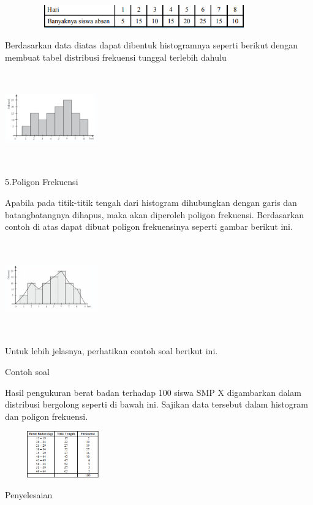 \documentclass[11pt,fleqn]{book} %
\begin{document}
{\includegraphics[width = 12cm, height= 1cm]{Pictures/7reska.png}

Berdasarkan data diatas dapat dibentuk histogramnya seperti berikut dengan membuat
tabel distribusi frekuensi tunggal terlebih dahulu

\includegraphics[width = 4cm, height= 4cm]{Pictures/8reska.png}

5.Poligon Frekuensi


Apabila pada titik-titik tengah dari histogram dihubungkan dengan garis dan batangbatangnya
dihapus, maka akan diperoleh poligon frekuensi. Berdasarkan contoh di atas
dapat dibuat poligon frekuensinya seperti gambar berikut ini.

\includegraphics[width = 4cm, height= 4cm]{Pictures/9reska.png}

Untuk lebih jelasnya, perhatikan contoh soal berikut ini.

Contoh soal

Hasil pengukuran berat badan terhadap 100 siswa SMP X digambarkan dalam distribusi
bergolong seperti di bawah ini. Sajikan data tersebut dalam histogram dan poligon frekuensi.


\includegraphics[width = 5cm, height= 2cm]{Pictures/10reska.png}

Penyelesaian

}
\end{document}
